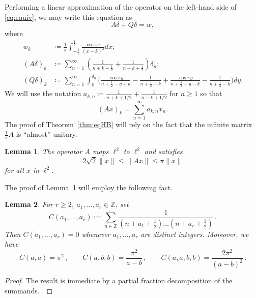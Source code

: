 \documentclass[12pt]{amsart}
\theoremstyle{plain}
\newtheorem{lemma}{Lemma}
\newcommand{\Z}{\mathbb{Z}}
\begin{document}
 Performing a linear approximation of the operator on the left-hand side of \eqref{eq:equiv}, we may write this equation as
\begin{equation} \label{eq:AQ}  A\delta + Q\delta = w ,\end{equation}
where
\begin{align*} w_k & \coloneqq  \frac{1}{\pi}\int_{-\frac{1}{2}}^{\frac{1}{2}} \frac{\cos \pi x}{(x-k)^2} dx; \\
     (A\delta )_k & \coloneqq \sum_{n=1}^{\infty} \left(\frac{1}{n+k+\frac12}+\frac{1}{n-k+\frac12}\right)\delta_n ; \\ 
     (Q\delta)_k & \coloneqq  \sum_{n=1}^{\infty} \int_0^{\delta_n} \Big(\frac{\cos \pi y}{n+\frac{1}{2}-y+k}-\frac{1}{n+\frac12+k}+\frac{\cos \pi y}{n+\frac{1}{2}-y-k}-\frac{1}{n+\frac12-k}\Big)dy.\end{align*}
We will use the notation $a_{k,n}\coloneqq \frac{1}{n+k+1/2}+\frac{1}{n-k+1/2}$ for $n\ge1$ so that 
\[ (Ax)_k=\sum_{n=1}^{\infty} a_{k,n} x_n. \]
The proof of Theorem~\ref{thm:eqHB} will rely on the fact that the infinite matrix $\frac{1}{\pi}A$ is ``almost'' unitary. 
\begin{lemma}\label{lem:norm}
 	The operator $A$ maps $\ell^2$ to $\ell^2$ and satisfies
 	\[2\sqrt{2}\|x\|\le \|Ax\|\le \pi\|x\|\]
 	for all $x$ in $\ell^2$. 
\end{lemma}

The proof of Lemma~\ref{lem:norm} will employ the following fact. 
\begin{lemma}\label{lem:partialf}
For $r\ge2$, $a_1,\dots,a_r\in\Z$, set
	\[C(a_1,\dots,a_r):=\sum_{n\in\Z}\frac{1}{(n+a_1+\frac12)\dots(n+a_r+\frac12)}\,.\]
Then $C(a_1,\dots,a_r)=0$ whenever $a_1,\dots,a_{r}$ are distinct integers. Moreover, we
have
\[C(a,a)=\pi^2\,,\qquad C(a,b,b)=\frac{\pi^2}{a-b}\,,\qquad
	C(a,a,b,b)=\frac{2\pi^2}{(a-b)^2}\,.\]
\end{lemma}
\begin{proof} The result is immediate by a partial fraction decomposition of the summands.~\end{proof} 
\end{document}
